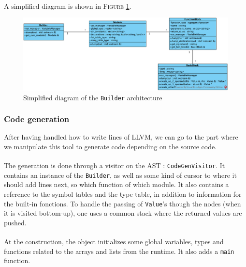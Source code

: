 \documentclass[a4paper,11pt]{article}
\begin{document}
\paragraph{}

A simplified diagram is shown in \textsc{Figure} \ref{codegen:builder}.

\begin{figure}
	\centering
	\includegraphics[scale=0.7]{Builder.png}
	\caption{Simplified diagram of the \texttt{Builder} architecture}
	\label{codegen:builder}
\end{figure}

	\subsubsection{Code generation}

After having handled how to write lines of LLVM, we can go to the part where we manipulate this tool to generate code depending on the source code.

\paragraph{}

The generation is done through a visitor on the AST : \texttt{CodeGenVisitor}. It contains an instance of the \texttt{Builder}, as well as some kind of cursor to where it should add lines next, so which function of which module. It also contains a reference to the symbol tables and the type table, in addition to information for the built-in fonctions. To handle the passing of \texttt{Value}'s though the nodes (when it is visited bottom-up), one uses a common stack where the returned values are pushed. 

\paragraph{}

At the construction, the object initializes some global variables, types and functions related to the arrays and lists from the runtime. It also adds a \texttt{main} function.
\end{document}
